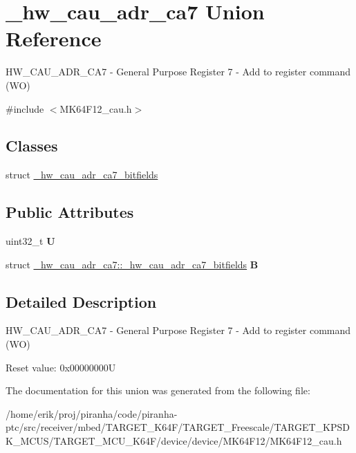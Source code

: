 \hypertarget{union__hw__cau__adr__ca7}{}\section{\+\_\+hw\+\_\+cau\+\_\+adr\+\_\+ca7 Union Reference}
\label{union__hw__cau__adr__ca7}


H\+W\+\_\+\+C\+A\+U\+\_\+\+A\+D\+R\+\_\+\+C\+A7 -\/ General Purpose Register 7 -\/ Add to register command (WO)  




{\ttfamily \#include $<$M\+K64\+F12\+\_\+cau.\+h$>$}

\subsection*{Classes}
\begin{DoxyCompactItemize}
\item 
struct \hyperlink{struct__hw__cau__adr__ca7_1_1__hw__cau__adr__ca7__bitfields}{\+\_\+hw\+\_\+cau\+\_\+adr\+\_\+ca7\+\_\+bitfields}
\end{DoxyCompactItemize}
\subsection*{Public Attributes}
\begin{DoxyCompactItemize}
\item 
uint32\+\_\+t {\bfseries U}\hypertarget{union__hw__cau__adr__ca7_aae6095b7bea628a0076768dbd7f9e456}{}\label{union__hw__cau__adr__ca7_aae6095b7bea628a0076768dbd7f9e456}

\item 
struct \hyperlink{struct__hw__cau__adr__ca7_1_1__hw__cau__adr__ca7__bitfields}{\+\_\+hw\+\_\+cau\+\_\+adr\+\_\+ca7\+::\+\_\+hw\+\_\+cau\+\_\+adr\+\_\+ca7\+\_\+bitfields} {\bfseries B}\hypertarget{union__hw__cau__adr__ca7_a4008e328d26dc91fc10744433ee9dd04}{}\label{union__hw__cau__adr__ca7_a4008e328d26dc91fc10744433ee9dd04}

\end{DoxyCompactItemize}


\subsection{Detailed Description}
H\+W\+\_\+\+C\+A\+U\+\_\+\+A\+D\+R\+\_\+\+C\+A7 -\/ General Purpose Register 7 -\/ Add to register command (WO) 

Reset value\+: 0x00000000U 

The documentation for this union was generated from the following file\+:\begin{DoxyCompactItemize}
\item 
/home/erik/proj/piranha/code/piranha-\/ptc/src/receiver/mbed/\+T\+A\+R\+G\+E\+T\+\_\+\+K64\+F/\+T\+A\+R\+G\+E\+T\+\_\+\+Freescale/\+T\+A\+R\+G\+E\+T\+\_\+\+K\+P\+S\+D\+K\+\_\+\+M\+C\+U\+S/\+T\+A\+R\+G\+E\+T\+\_\+\+M\+C\+U\+\_\+\+K64\+F/device/device/\+M\+K64\+F12/M\+K64\+F12\+\_\+cau.\+h\end{DoxyCompactItemize}
